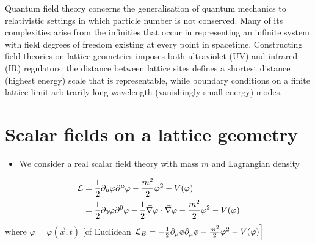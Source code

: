 
Quantum field theory concerns the generalisation of quantum mechanics to relativistic settings in which particle number is not conserved. Many of its complexities arise from the infinities that occur in representing an infinite system with field degrees of freedom existing at every point in spacetime. Constructing field theories on lattice geometries imposes both ultraviolet (UV) and infrared (IR) regulators: the distance between lattice sites defines a shortest distance (highest energy) scale that is representable, while boundary conditions on a finite lattice limit arbitrarily long-wavelength (vanishingly small  energy) modes.
 
\section{Scalar fields on a lattice geometry}

\begin{itemize}
  \item We consider a real scalar field theory with mass \(m\) and Lagrangian density
\end{itemize}
\begin{equation}
\begin{aligned}
{\cal L} & =\frac{1}{2} \partial_{\mu} \varphi \partial^{\mu} \varphi-\frac{m^{2}}{2} \varphi^{2}-V(\varphi) \\
& =\frac{1}{2} \partial_{0} \varphi \partial^{0} \varphi-\frac{1}{2} \vec{\nabla} \varphi \cdot \vec{\nabla} \varphi-\frac{m^{2}}{2} \varphi^{2}-V(\varphi)
\end{aligned}
\end{equation}
where $\varphi=\varphi(\vec{x}, t) $
[cf Euclidean \(\left.{\cal L}_{E}=-\frac{1}{2} \partial_{\mu} \phi \partial_{\mu} \phi-\frac{m^{2}}{2} \varphi^{2}-V(\varphi)\right]\)

